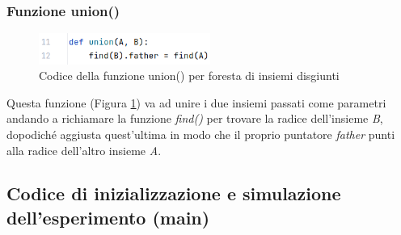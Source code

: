 \documentclass[12pt]{article}
\begin{document}
\subsubsection{Funzione union()}
\begin{figure}[h]
    \centering
    \includegraphics[width=0.5\textwidth]{images/set_forest_code_images/sf_union.png}
    \caption{Codice della funzione union() per foresta di insiemi disgiunti}
    \label{fig:sf_union}
\end{figure}
Questa funzione (Figura \ref{fig:sf_union}) va ad unire i due insiemi passati come parametri andando a richiamare la funzione \textit{find()} per trovare la radice dell'insieme \textit{B}, dopodiché aggiusta quest'ultima in modo che il proprio puntatore \textit{father} punti alla radice dell'altro insieme \textit{A}.

\subsection{Codice di inizializzazione e simulazione dell'esperimento (main)}
\end{document}
